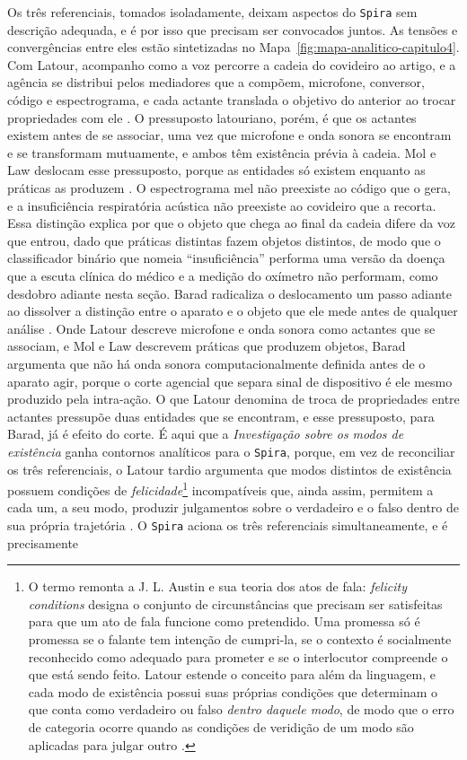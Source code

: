 Os três referenciais, tomados isoladamente, deixam aspectos do \texttt{Spira} sem descrição adequada, e é por isso que precisam ser convocados juntos. As tensões e convergências entre eles estão sintetizadas no Mapa~\ref{fig:mapa-analitico-capitulo4}. Com Latour, acompanho como a voz percorre a cadeia do covideiro ao artigo, e a agência se distribui pelos mediadores que a compõem, microfone, conversor, código e espectrograma, e cada actante translada o objetivo do anterior ao trocar propriedades com ele \parencite{Latour2011CienciaEmAcao,Latour2008Powers}. O pressuposto latouriano, porém, é que os actantes existem antes de se associar, uma vez que microfone e onda sonora se encontram e se transformam mutuamente, e ambos têm existência prévia à cadeia. Mol e Law deslocam esse pressuposto, porque as entidades só existem enquanto as práticas as produzem \parencite{mol2002body,Law2004After}. O espectrograma mel não preexiste ao código que o gera, e a insuficiência respiratória acústica não preexiste ao covideiro que a recorta. Essa distinção explica por que o objeto que chega ao final da cadeia difere da voz que entrou, dado que práticas distintas fazem objetos distintos, de modo que o classificador binário que nomeia \enquote{insuficiência} performa uma versão da doença que a escuta clínica do médico e a medição do oxímetro não performam, como desdobro adiante nesta seção. Barad radicaliza o deslocamento um passo adiante ao dissolver a distinção entre o aparato e o objeto que ele mede antes de qualquer análise \parencite{Barad2007Meeting}. Onde Latour descreve microfone e onda sonora como actantes que se associam, e Mol e Law descrevem práticas que produzem objetos, Barad argumenta que não há onda sonora computacionalmente definida antes de o aparato agir, porque o corte agencial que separa sinal de dispositivo é ele mesmo produzido pela intra-ação. O que Latour denomina de troca de propriedades entre actantes pressupõe duas entidades que se encontram, e esse pressuposto, para Barad, já é efeito do corte. É aqui que a \textit{Investigação sobre os modos de existência} ganha contornos analíticos para o \texttt{Spira}, porque, em vez de reconciliar os três referenciais, o Latour tardio argumenta que modos distintos de existência possuem condições de \textit{felicidade}\footnote{O termo remonta a J. L. Austin e sua teoria dos atos de fala: \textit{felicity conditions} designa o conjunto de circunstâncias que precisam ser satisfeitas para que um ato de fala funcione como pretendido. Uma promessa só é promessa se o falante tem intenção de cumpri-la, se o contexto é socialmente reconhecido como adequado para prometer e se o interlocutor compreende o que está sendo feito. Latour estende o conceito para além da linguagem, e cada modo de existência possui suas próprias condições que determinam o que conta como verdadeiro ou falso \textit{dentro daquele modo}, de modo que o erro de categoria ocorre quando as condições de veridição de um modo são aplicadas para julgar outro \parencite[pp.~17--18]{Latour2019Investigacao}.} incompatíveis que, ainda assim, permitem a cada um, a seu modo, produzir julgamentos sobre o verdadeiro e o falso dentro de sua própria trajetória \parencite[p.~18]{Latour2019Investigacao}. O \texttt{Spira} aciona os três referenciais simultaneamente, e é precisamente 